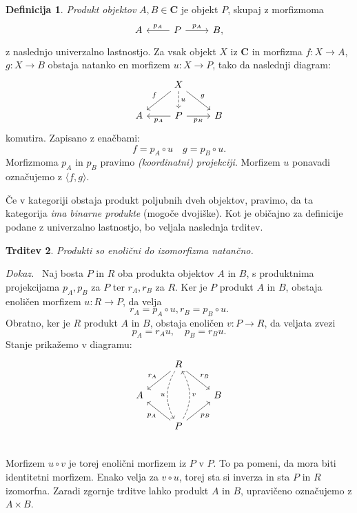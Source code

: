 \documentclass[12pt,a4paper]{book}
\theoremstyle{definition}
\newtheorem{definicija}{Definicija}[chapter]
\theoremstyle{plain}
\newtheorem{trditev}[definicija]{Trditev}
\newenvironment{dokaz}{\emph{Dokaz.}\ }{\hspace{\fill}{$\Box$}}
\theoremstyle{definition}
\theoremstyle{remark}
\newcommand{\cat}[1]{\textbf{#1}}
\begin{document}
\begin{definicija}
\emph{Produkt objektov} $A,B \in \cat{C}$ je objekt $P$, skupaj z morfizmoma
$$\begin{tikzcd}
A & P \ar[l, "p_A"'] \ar[r, "p_A"] & B,
\end{tikzcd}$$
z naslednjo univerzalno lastnostjo. Za vsak objekt $X$ iz $\cat{C}$ in morfizma $f : X \to A$, $g : X \to B$ obstaja natanko en morfizem $u : X \to P$, tako da naslednji diagram:
%
$$\begin{tikzcd}
& X \ar[ld, "f"'] \ar[d, dashed, "u"] \ar[rd, "g"] & \\
A & P \ar[l, "p_A"] \ar[r, "p_B"'] & B
\end{tikzcd}$$
%
komutira. Zapisano z enačbami:
$$f = p_A \circ u \quad g = p_B \circ u.$$
Morfizmoma $p_A$ in $p_B$ pravimo \emph{(koordinatni) projekciji}. Morfizem $u$ ponavadi označujemo z $\langle f,g \rangle$.
\end{definicija}
%
Če v kategoriji obstaja produkt poljubnih dveh objektov, pravimo, da ta kategorija \emph{ima binarne produkte} (mogoče dvojiške).
%
Kot je običajno za definicije podane z univerzalno lastnostjo, bo veljala naslednja trditev.
%
\begin{trditev}
Produkti so enolični do izomorfizma natančno.
\end{trditev}
\begin{dokaz}
Naj bosta $P$ in $R$ oba produkta objektov $A$ in $B$, s produktnima projekcijama $p_A, p_B$ za $P$ ter $r_A, r_B$ za $R$. Ker je $P$ produkt $A$ in $B$, obstaja enoličen morfizem $u : R \to P$, da velja 
$$r_A = p_A \circ u, r_B = p_B \circ u.$$
Obratno, ker je $R$ produkt $A$ in $B$, obstaja enoličen $v : P \to R$, da veljata zvezi
$$p_A = r_Au, \quad p_B = r_Bu.$$
Stanje prikažemo v diagramu:
%
$$\begin{tikzcd}
& R \ar[dd, dashed, bend right, "u"'] \ar[dl, "r_A"'] \ar[dr, "r_B"] & \\
A & & B \\
& P \ar[uu, dashed, bend right, "v"'] \ar[ul, "p_A"] \ar[ur, "p_B"'] & \\
\end{tikzcd}$$
%
Morfizem $u \circ v $ je torej enolični morfizem iz $P$ v $P$. To pa pomeni, da mora biti identitetni morfizem. Enako velja za $v \circ u$, torej sta si inverza in sta $P$ in $R$ izomorfna.
\end{dokaz}
%
Zaradi zgornje trditve lahko produkt $A$ in $B$, upravičeno označujemo z $A \times B$.
%
\end{document}
